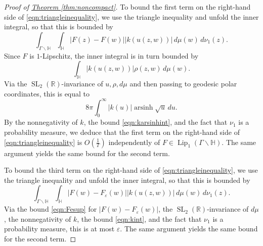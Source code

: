 \documentclass[11pt,a4paper]{amsart}
\newcommand{\e}{\varepsilon}
\newcommand{\Hb}{\mathbb{H}}
\newcommand{\R}{\mathbb{R}}
\DeclareMathOperator{\arsinh}{arsinh}
\DeclareMathOperator{\Lip}{Lip}
\DeclareMathOperator{\SL}{SL}
\numberwithin{equation}{section}
\theoremstyle{remark}
\theoremstyle{definition}
\begin{document}
\begin{proof}[Proof of {\hyperref[thm:noncompact]{Theorem \ref*{thm:noncompact}}}]
To bound the first term on the right-hand side of \eqref{eqn:triangleinequality}, we use the triangle inequality and unfold the inner integral, so that this is bounded by
\[\int_{\Gamma \backslash \Hb} \int_{\Hb} |F(z) - F(w)| |k(u(z,w))| \, d\mu(w) \, d\nu_1(z).\]
Since $F$ is $1$-Lipschitz, the inner integral is in turn bounded by
\[\int_{\Hb} |k(u(z,w))| \rho(z,w) \, d\mu(w).\]
Via the $\SL_2(\R)$-invariance of $u,\rho,d\mu$ and then passing to geodesic polar coordinates, this is equal to
\[8\pi \int_{0}^{\infty} |k(u)| \arsinh \sqrt{u} \, du.\]
By the nonnegativity of $k$, the bound \eqref{eqn:karsinhint}, and the fact that $\nu_1$ is a probability measure, we deduce that the first term on the right-hand side of \eqref{eqn:triangleinequality} is $O(\frac{1}{T})$ independently of $F \in \Lip_1(\Gamma \backslash \Hb)$. The same argument yields the same bound for the second term.

To bound the third term on the right-hand side of \eqref{eqn:triangleinequality}, we use the triangle inequality and unfold the inner integral, so that this is bounded by
\[\int_{\Gamma \backslash \Hb} \int_{\Hb} |F(w) - F_{\e}(w)| |k(u(z,w))| \, d\mu(w) \, d\nu_1(z).\]
Via the bound \eqref{eqn:Fesup} for $|F(w) - F_{\e}(w)|$, the $\SL_2(\R)$-invariance of $d\mu$, the nonnegativity of $k$, the bound \eqref{eqn:kint}, and the fact that $\nu_1$ is a probability measure, this is at most $\e$. The same argument yields the same bound for the second term.


\end{proof}
\end{document}
